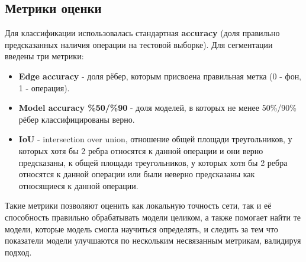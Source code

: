 \subsection{Метрики оценки}
Для классификации использовалась стандартная \textbf{accuracy} (доля правильно предсказанных наличия операции на тестовой выборке). Для сегментации введены три метрики:
\begin{itemize}
    \item \textbf{Edge accuracy} - доля рёбер, которым присвоена правильная метка (0 - фон, 1 - операция).
    \item \textbf{Model accuracy \%50/\%90} - доля моделей, в которых не менее 50\%/90\% рёбер классифицированы верно.
    \item \textbf{IoU} - intersection over union, отношение общей площади треугольников, у которых хотя бы 2 ребра относятся к данной операции и они верно предсказаны, к общей площади треугольников, у которых хотя бы 2 ребра относятся к данной операции или были неверно предсказаны как относящиеся к данной операции.
\end{itemize}

Такие метрики позволяют оценить как локальную точность сети, так и её способность правильно обрабатывать модели целиком, а также помогает найти те модели, которые модель смогла научиться определять, и следить за тем что показатели модели улучшаются по нескольким несвязанным метрикам, валидируя подход.

